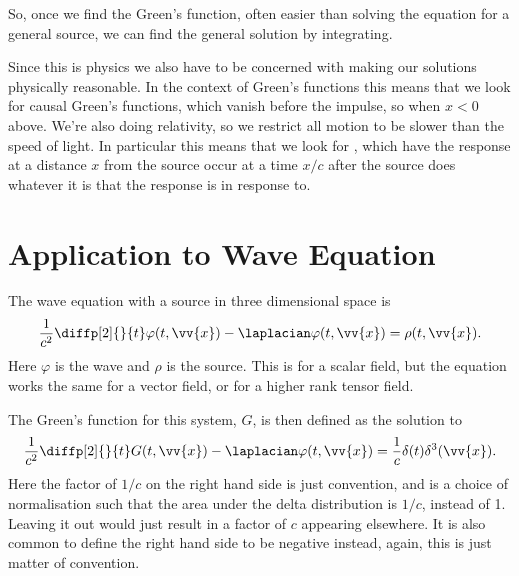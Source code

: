 \documentclass[fleqn]{NotesClass}
\begin{document}
    So, once we find the Green's function, often easier than solving the equation for a general source, we can find the general solution by integrating.
    
    Since this is physics we also have to be concerned with making our solutions physically reasonable.
    In the context of Green's functions this means that we look for causal Green's functions, which vanish before the impulse, so when \(x < 0\) above.
    We're also doing relativity, so we restrict all motion to be slower than the speed of light.
    In particular this means that we look for , which have the response at a distance \(x\) from the source occur at a time \(x/c\) after the source does whatever it is that the response is in response to.
    
    \section{Application to Wave Equation}
    The wave equation with a source in three dimensional space is
    \begin{equation}
        \frac{1}{c^2} \diffp[2]{}{t} \varphi(t, \vv{x}) - \laplacian \varphi(t, \vv{x}) = \rho(t, \vv{x}).
    \end{equation}
    Here \(\varphi\) is the wave and \(\rho\) is the source.
    This is for a scalar field, but the equation works the same for a vector field, or for a higher rank tensor field.
    
    The Green's function for this system, \(G\), is then defined as the solution to
    \begin{equation}
        \frac{1}{c^2} \diffp[2]{}{t} G(t, \vv{x}) - \laplacian \varphi(t, \vv{x}) = \frac{1}{c} \delta(t) \delta^3(\vv{x}).
    \end{equation}
    Here the factor of \(1/c\) on the right hand side is just convention, and is a choice of normalisation such that the area under the delta distribution is \(1/c\), instead of 1.
    Leaving it out would just result in a factor of \(c\) appearing elsewhere.
    It is also common to define the right hand side to be negative instead, again, this is just matter of convention.
    
\end{document}
